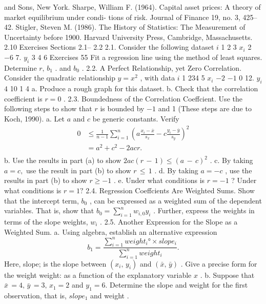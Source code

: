 \documentclass[11pt]{article}
\begin{document}
and Sons, New York.
Sharpe, William F. (1964). Capital asset prices: A theory of market equilibrium under condi-
tions of risk. Journal of Finance 19, no. 3, 425-- 42.
Stigler, Steven M. (1986). The History of Statistics: The Measurement of Uncertainty before
1900. Harvard University Press, Cambridge, Massachusetts.
2.10 Exercises
Sections 2.1-- 2.2
 2.1. Consider the following dataset
\(i\) 1 2 3
\(x_{i}\) 2 \(- 6\) 7.
\(y_{i}\) 3 4 6
 Exercises 55
Fit a regression line using the method of least squares. Determine \(r , \, b_{1}\) .
and \(b_{0}\) .
2.2. A Perfect Relationship, yet Zero Correlation. Consider the quadratic
relationship \(y=x^{2}\) , with data
\(i\) 1 234 5
\(x_{i}\) \(- 2\) \(- 1\) 0 12.
\(y_{i}\) \(4\) 10 1 4
 a. Produce a rough graph for this dataset.
b. Check that the correlation coefficient is \(r=0\) .
2.3. Boundedness of the Correlation Coeffcient. Use the following steps to
 show that \(r\) is bounded by \(- 1\) and 1 (These steps are due to Koch, 1990).
a. Let \(a\) and \(c\) be generic constants. Verify
\[
\begin{aligned} {0} & {{} \leq\frac{1} {n-1} \sum_{i=1}^{n} \left( a \frac{x_{i}-\overline{{x}}} {s_{x}}-c \frac{y_{i}-\overline{{y}}} {s_{y}} \right)^{2}} \\ {} & {{}=a^{2}+c^{2}-2 a c r .} \\ \end{aligned}
\]
b. Use the results in part (a) to show \(2 a c ( r \,-\, 1 ) \leq( a \,-\, c )^{2}\) .
c. By taking \(a=c ,\) use the result in part (b) to show \(r \, \leq\, 1\) .
d. By taking \(a=-c\) , use the results in part (b) to show \(r \geq-1\) .
e. Under what conditions is \(r=-1\) ? Under what conditions is \(r=1 ?\)
2.4. Regression Coeffcients Are Weighted Sums. Show that the intercept
term, \(b_{0}\) , can be expressed as a weighted sum of the dependent variables.
That is, show that \(b_{0}=\sum_{i=1}^{n} w_{i , 0} y_{i}\) . Further, express the weights in terms
of the slope weights, \(w_{i}\) .
2.5. Another Expression for the Slope as a Weighted Sum.
 a. Using algebra, establish an alternative expression
\[
b_{1}={\frac{\sum_{i=1}^{n} {w e i g h t_{i} °} \times s l o p e_{i}} {\sum_{i=1}^{n} {w e i g h t_{i}}}} .
\]
Here, slope; is the slope between \(( x_{i} , \, y_{i} )\) and \(( \bar{x} , \, \bar{y} )\) . Give a precise form
 for the weight weight: as a function of the explanatory variable \(x\) .
b. Suppose that \(\bar{x} \,=4 , \, \bar{y} \,=3 , \, x_{1}=2\) and \(y_{1}=6 .\) Determine the slope and
weight for the first observation, that is, \(s l o p e_{1}\) and weight .
\end{document}

